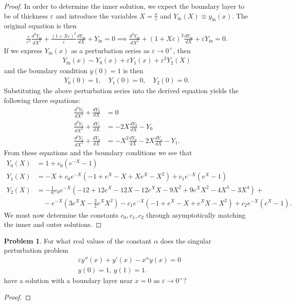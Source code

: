 \documentclass[12pt]{article}
\theoremstyle{definition}
\newtheorem{problem}{Problem}
\begin{document}
\begin{proof}
  In order to determine the inner solution, we expect the boundary layer to be of thickness $\varepsilon$
  and introduce the variables $X= \frac{x}{\varepsilon}$ and $Y_{\text{in}}(X) \equiv y_{\text{in}}(x)$. The original equation is then
  \begin{align*}
    \frac{\varepsilon}{\varepsilon^2} \frac{d^2 Y_{\text{in}}}{dX^2} + \frac{(1+X\varepsilon)^2 }{\varepsilon}\frac{d Y_{\text{in}}}{dX} + Y_{\text{in}} = 0 \implies \frac{d^2 Y_{\text{in}}}{dX^2} + (1+X\varepsilon)^2\frac{d Y_{\text{in}}}{dX} + \varepsilon Y_{\text{in}} = 0.
  \end{align*}
  If we express $Y_{\text{in}}(x)$ as a perturbation series as $\varepsilon \to 0^+$, then
  \begin{align*}
    Y_{\text{in}}(x) \sim Y_0(x) + \varepsilon Y_1(x) + \varepsilon^2 Y_2(X)
  \end{align*}
  and the boundary condition $y(0) = 1$ is then
  \begin{align*}
    Y_0(0) = 1, \quad Y_1(0) = 0, \quad Y_2(0) = 0.
  \end{align*}
  Substituting the above perturbation series into the derived equation yields the following
  three equations:
  \begin{align*}
    \frac{d^2Y_0}{dX^2} +\frac{dY_0}{dX} &= 0\\
    \frac{d^2Y_1}{dX^2} +\frac{dY_1}{dX} &= -2X\frac{dY_0}{dX} - Y_0\\
    \frac{d^2Y_2}{dX^2} +\frac{dY_2}{dX} &= -X^2\frac{dY_0}{dX} -2X\frac{dY_1}{dX}- Y_1.
  \end{align*}
  From these equations and the boundary conditions we see that
  \begin{align*}
    Y_0(X) &= 1 + c_0(e^{-X} - 1)\\
    Y_1(X) &= -X + c_0 e^{-X}\left(-1+e^X-X+Xe^X-X^2\right) + c_1 e^{-X}(e^{X} - 1) \\
    Y_2(X) &=  - \frac{1}{6} c_0 e^{-X} (-12 + 12 e^X - 12 X - 12 e^X X - 9 X^2 + 9 e^X X^2 - 4 X^3 - 3 X^4) + \\
    &\quad - e^{-X} (3 e^X X - \frac{3}{2} e^X X^2) - c_1 e^{-X} (-1 + e^X - X + e^X X - X^2) + c_2 e^{-X} (e^X-1).
  \end{align*}
  We must now determine the constants $c_0, c_1, c_2$ through asymptotically matching the inner and outer solutions.
\end{proof}
\newpage


\begin{problem}
  For what real values of the constant $\alpha$ does the singular perturbation
  problem
  \begin{align*}
    &\varepsilon y''(x) + y'(x) - x^\alpha y(x) = 0  \\
    &y(0) = 1,\ y(1) = 1.
  \end{align*}
  have a solution with a boundary layer near $x=0$ as $\varepsilon \to 0^+$?
\end{problem}

\begin{proof}
\end{proof}
\newpage
\end{document}

